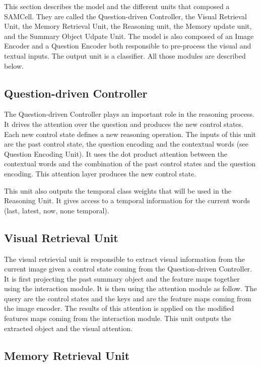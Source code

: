 This section describes the model and the different units that composed a SAMCell. They are called the Question-driven Controller, the Visual Retrieval Unit, the Memory Retrieval Unit, the Reasoning unit, the Memory update unit, and the Summary Object Udpate Unit. 
The model is also composed of an Image Encoder and a Question Encoder both responsible to pre-process the visual and textual inputs. The output unit is a classifier.
All those modules are described below.


\subsection{Question-driven Controller}

The Question-driven Controller plays an important role in the reasoning process.
It drives the attention over the question and produces the new control states. Each new control state defines a new reasoning operation. The inputs of this unit are the past control state, the question encoding and the contextual words (see Question Encoding Unit). It uses the dot product attention between the contextual words
and the combination of the past control states and the question encoding.  This attention layer produces the new control state.

This unit also outputs the temporal class weights that will be used in the Reasoning Unit. It gives access to a temporal information for the current words (last, latest, now, none temporal).

\subsection{Visual Retrieval Unit}

The visual retrievial unit is responsible to extract visual information from the current image given a control state coming from the Question-driven Controller. It is first projecting the past summary object and the feature maps together using the interaction module.
It is then using the attention module as follow. The query are the control states and the keys and are the feature maps coming from the image encoder. The results of this attention is applied on the modified features maps coming from the interaction module.  
This unit outputs the extracted object and the visual attention.

\subsection{Memory Retrieval Unit}

